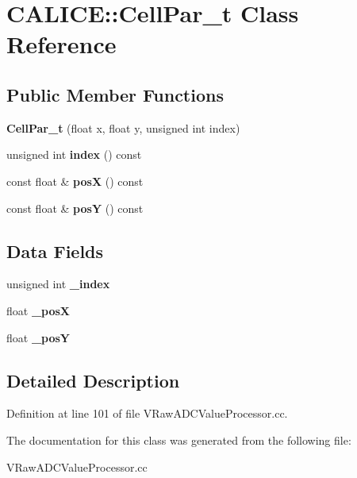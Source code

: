 \section{C\-A\-L\-I\-C\-E\-:\-:Cell\-Par\-\_\-t Class Reference}
\label{classCALICE_1_1CellPar__t}
\subsection*{Public Member Functions}
\begin{DoxyCompactItemize}
\item 
{\bfseries Cell\-Par\-\_\-t} (float x, float y, unsigned int index)\label{classCALICE_1_1CellPar__t_a4a421af43e94b139ef5dcfd7525c2271}

\item 
unsigned int {\bfseries index} () const \label{classCALICE_1_1CellPar__t_a24feee6789d715f0503092d8594b34e4}

\item 
const float \& {\bfseries pos\-X} () const \label{classCALICE_1_1CellPar__t_a1e053bcf09cd9d47c42f5bb05e18bb10}

\item 
const float \& {\bfseries pos\-Y} () const \label{classCALICE_1_1CellPar__t_a64b678b384ef3bc481ce1c2f9aa07808}

\end{DoxyCompactItemize}
\subsection*{Data Fields}
\begin{DoxyCompactItemize}
\item 
unsigned int {\bfseries \-\_\-index}\label{classCALICE_1_1CellPar__t_a2f58580b68327c8eab7867461106119a}

\item 
float {\bfseries \-\_\-pos\-X}\label{classCALICE_1_1CellPar__t_a3b93d132cf7bb73e042c88c060c8e115}

\item 
float {\bfseries \-\_\-pos\-Y}\label{classCALICE_1_1CellPar__t_a43eb3039ef1edbedba6953629cd16c05}

\end{DoxyCompactItemize}


\subsection{Detailed Description}


Definition at line 101 of file V\-Raw\-A\-D\-C\-Value\-Processor.\-cc.



The documentation for this class was generated from the following file\-:\begin{DoxyCompactItemize}
\item 
V\-Raw\-A\-D\-C\-Value\-Processor.\-cc\end{DoxyCompactItemize}
